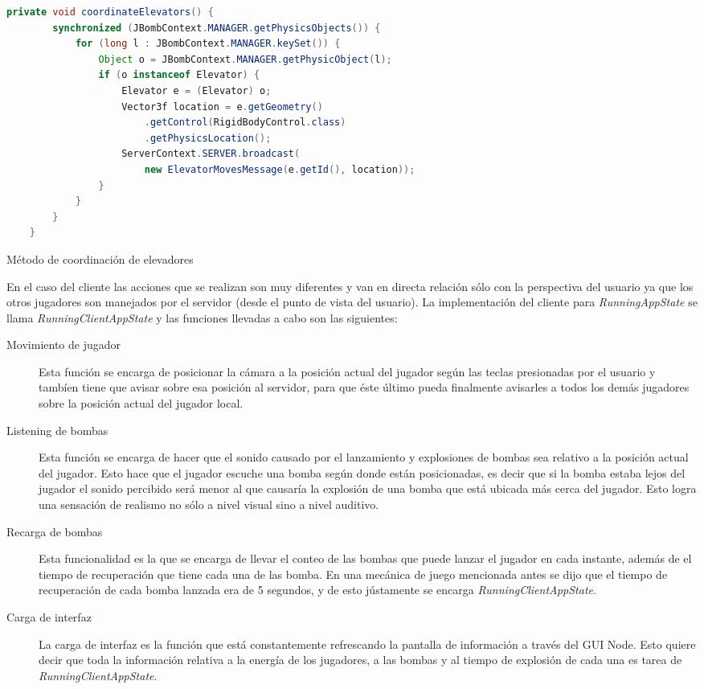 \documentclass[a4paper,12pt,openany,oneside]{book}
\begin{document}
\begin{codigo}
\begin{lstlisting}[language=Java,frame=single,basicstyle=\scriptsize]
private void coordinateElevators() {
        synchronized (JBombContext.MANAGER.getPhysicsObjects()) {
            for (long l : JBombContext.MANAGER.keySet()) {
                Object o = JBombContext.MANAGER.getPhysicObject(l);
                if (o instanceof Elevator) {
                    Elevator e = (Elevator) o;
                    Vector3f location = e.getGeometry()
                    	.getControl(RigidBodyControl.class)
                    	.getPhysicsLocation();
                    ServerContext.SERVER.broadcast(
                    	new ElevatorMovesMessage(e.getId(), location));
                }
            }
        }
    }
\end{lstlisting}
\caption{Método de coordinación de elevadores}
\label{lst2}
\end{codigo}
En el caso del cliente las acciones que se realizan son muy diferentes y van en directa relación sólo con la perspectiva del usuario ya que los otros jugadores son manejados por el servidor (desde el punto de vista del usuario). La implementación del cliente para \textit{RunningAppState} se llama \textit{RunningClientAppState} y las funciones llevadas a cabo son las siguientes:
\begin{description}
\item[Movimiento de jugador] Esta función se encarga de posicionar la cámara a la posición actual del jugador según las teclas presionadas por el usuario y tambíen tiene que avisar sobre esa posición al servidor, para que éste último pueda finalmente avisarles a todos los demás jugadores sobre la posición actual del jugador local.
\item[Listening de bombas] Esta función se encarga de hacer que el sonido causado por el lanzamiento y explosiones de bombas sea relativo a la posición actual del jugador. Esto hace que el jugador escuche una bomba según donde están posicionadas, es decir que si la bomba estaba lejos del jugador el sonido percibido será menor al que causaría la explosión de una bomba que está ubicada más cerca del jugador. Esto logra una sensación de realismo no sólo a nivel visual sino a nivel auditivo.
\item[Recarga de bombas] Esta funcionalidad es la que se encarga de llevar el conteo de las bombas que puede lanzar el jugador en cada instante, además de el tiempo de recuperación que tiene cada una de las bomba. En una mecánica de juego mencionada antes se dijo que el tiempo de recuperación de cada bomba lanzada era de 5 segundos, y de esto jústamente se encarga \textit{RunningClientAppState}.
\item[Carga de interfaz] La carga de interfaz es la función que está constantemente refrescando la pantalla de información a través del GUI Node. Esto quiere decir que toda la información relativa a la energía de los jugadores, a las bombas y al tiempo de explosión de cada una es tarea de \textit{RunningClientAppState}.
\end{description}
\end{document}
